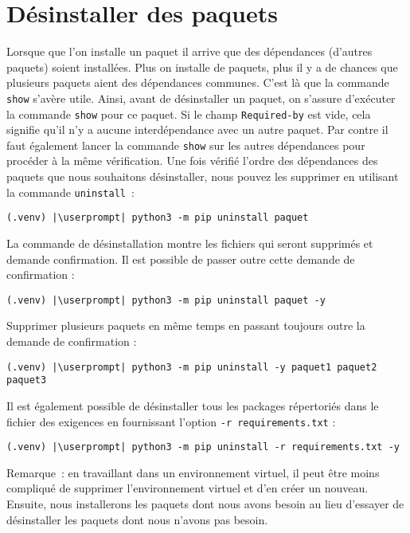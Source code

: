 \section{Désinstaller des paquets}
Lorsque que l'on installe un paquet il arrive que des dépendances (d'autres paquets) soient installées. Plus on installe de paquets, plus il y a de chances que plusieurs paquets aient des dépendances communes. C’est là que la commande \texttt{show} s’avère utile. Ainsi, avant de désinstaller un paquet, on s'assure d’exécuter la commande \texttt{show} pour ce paquet. Si le champ \texttt{Required-by} est vide, cela signifie qu'il n'y a aucune interdépendance avec un autre paquet. Par contre il faut également lancer la commande \texttt{show} sur les autres dépendances pour procéder à la même vérification. Une fois vérifié l’ordre des dépendances des paquets que nous souhaitons désinstaller, nous pouvez les supprimer en utilisant la commande \texttt{uninstall} :
\begin{lstlisting}[style=bash]
(.venv) |\userprompt| python3 -m pip uninstall paquet
\end{lstlisting}

La commande de désinstallation montre les fichiers qui seront supprimés et demande confirmation. Il est possible de passer outre cette demande de confirmation :
\begin{lstlisting}[style=bash]
(.venv) |\userprompt| python3 -m pip uninstall paquet -y
\end{lstlisting}

Supprimer plusieurs paquets en même temps en passant toujours outre la demande de confirmation :
\begin{lstlisting}[style=bash]
(.venv) |\userprompt| python3 -m pip uninstall -y paquet1 paquet2 paquet3
\end{lstlisting}

Il est également possible de désinstaller tous les packages répertoriés dans le fichier des exigences en fournissant l’option \texttt{-r requirements.txt} :
\begin{lstlisting}[style=bash]
(.venv) |\userprompt| python3 -m pip uninstall -r requirements.txt -y 
\end{lstlisting}

Remarque : en travaillant dans un environnement virtuel, il peut être moins compliqué de supprimer l'environnement virtuel et d’en créer un nouveau. Ensuite, nous installerons les paquets dont nous avons besoin au lieu d’essayer de désinstaller les paquets dont nous n’avons pas besoin.

